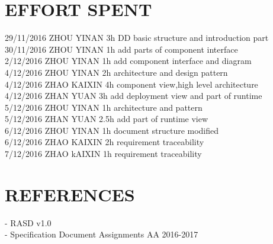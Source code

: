 \documentclass{article}
\begin{document}
	\section{EFFORT SPENT}
	29/11/2016 ZHOU YINAN 3h DD basic structure and introduction part\\
	30/11/2016 ZHOU YINAN 1h add parts of component interface\\
	2/12/2016 ZHOU YINAN 1h add component interface and diagram\\
	4/12/2016 ZHOU YINAN 2h architecture and design pattern\\
	4/12/2016 ZHAO KAIXIN 4h component view,high level architecture\\
	4/12/2016 ZHAN YUAN 3h add deployment view and part of runtime\\
	5/12/2016 ZHOU YINAN 1h architecture and pattern\\
	5/12/2016 ZHAN YUAN 2.5h add part of runtime view \\
	6/12/2016 ZHOU YINAN 1h document structure modified	\\
	6/12/2016 ZHAO KAIXIN 2h requirement traceability\\
	7/12/2016 ZHAO kAIXIN 1h requirement traceability
	
	\newpage
	\section{REFERENCES}
	- RASD v1.0 \\
	-  Specification Document Assignments AA 2016-2017
	
\end{document}
